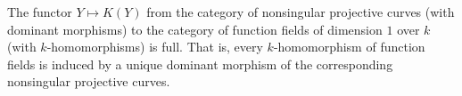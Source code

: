 The functor $Y \mapsto K(Y)$ from the category of nonsingular projective curves (with dominant morphisms) to the category of function fields of dimension $1$ over $k$ (with $k$-homomorphisms) is full. That is, every $k$-homomorphism of function fields is induced by a unique dominant morphism of the corresponding nonsingular projective curves.
